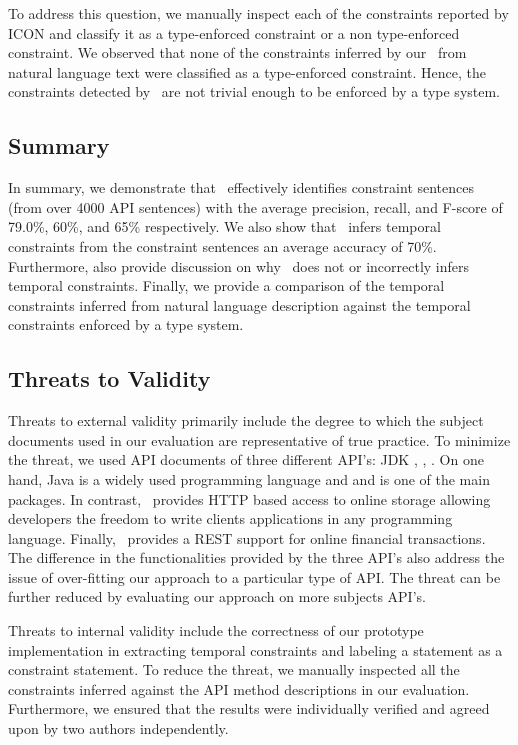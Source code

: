 To address this question, we manually inspect each of the constraints reported by ICON and classify it as a type-enforced constraint or a non type-enforced constraint. 
We observed that none of the constraints inferred by our \tool\ from natural language text were classified as a type-enforced constraint.
Hence, the constraints detected by \tool\ are not trivial enough to be enforced by a type system.




\subsection{Summary}
\label{sub:summary}

In summary, we demonstrate that \tool\ effectively identifies constraint sentences (from over 4000 API sentences) with the average precision, recall, and F-score of 79.0\%, 60\%, and 65\% respectively. We also show that \tool\ infers temporal constraints from the constraint sentences an average accuracy of 70\%. Furthermore, also provide discussion on why \tool\ does not or incorrectly infers temporal constraints. Finally, we provide a comparison of the temporal constraints inferred from natural language description against the temporal constraints enforced by a type system. 


\subsection{Threats to Validity}
\label{sub:threats_to_validity}
Threats to external validity primarily include the degree to which the subject documents used in our evaluation are representative of true practice. To minimize the threat, we used API documents of three different API's: JDK , \amazonAPI, \paypalAPI. On one hand, Java is a widely used programming language and  and is one of the main packages. In contrast, \amazonAPI\ provides HTTP based access to online storage allowing developers the freedom to write clients applications in any programming language. Finally, \paypalAPI\ provides a REST support for online financial transactions. The difference in the functionalities provided by the three API's also address the issue of over-fitting our approach to a particular type of API. The threat can be further reduced by evaluating our approach on more subjects API's. 

Threats to internal validity include the correctness of our prototype implementation in extracting temporal constraints and labeling a statement as a constraint statement. To reduce the threat, we manually inspected all the constraints inferred against the API method descriptions in our evaluation. Furthermore, we ensured that the results were individually verified and agreed upon by two authors independently.




